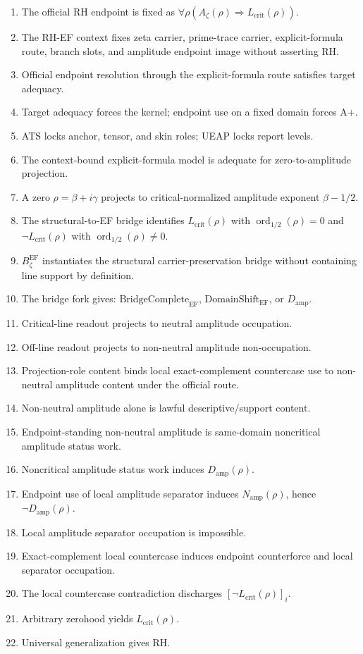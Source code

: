 \documentclass[11pt]{article}
\newcommand{\Az}{A_{\zeta}}
\newcommand{\Lcrit}{L_{\mathrm{crit}}}
\newcommand{\Damp}{D_{\mathrm{amp}}}
\newcommand{\Namp}{N_{\mathrm{amp}}}
\newcommand{\ordhalf}{\operatorname{ord}_{1/2}}
\newcommand{\BzetaEF}{B^{\mathrm{EF}}_{\zeta}}
\newcommand{\BridgeCompleteEF}{\mathrm{BridgeComplete}_{\mathrm{EF}}}
\newcommand{\DomainShiftEF}{\mathrm{DomainShift}_{\mathrm{EF}}}
\begin{document}
\begin{enumerate}
\item The official RH endpoint is fixed as \(\forall\rho(\Az(\rho)\Rightarrow\Lcrit(\rho))\).
\item The RH-EF context fixes zeta carrier, prime-trace carrier, explicit-formula route, branch slots, and amplitude endpoint image without asserting RH.
\item Official endpoint resolution through the explicit-formula route satisfies target adequacy.
\item Target adequacy forces the kernel; endpoint use on a fixed domain forces A+.
\item ATS locks anchor, tensor, and skin roles; UEAP locks report levels.
\item The context-bound explicit-formula model is adequate for zero-to-amplitude projection.
\item A zero \(\rho=\beta+i\gamma\) projects to critical-normalized amplitude exponent \(\beta-1/2\).
\item The structural-to-EF bridge identifies \(\Lcrit(\rho)\) with \(\ordhalf(\rho)=0\) and \(\neg\Lcrit(\rho)\) with \(\ordhalf(\rho)\ne0\).
\item \(\BzetaEF\) instantiates the structural carrier-preservation bridge without containing line support by definition.
\item The bridge fork gives: \(\BridgeCompleteEF\), \(\DomainShiftEF\), or \(\Damp\).
\item Critical-line readout projects to neutral amplitude occupation.
\item Off-line readout projects to non-neutral amplitude non-occupation.
\item Projection-role content binds local exact-complement countercase use to non-neutral amplitude content under the official route.
\item Non-neutral amplitude alone is lawful descriptive/support content.
\item Endpoint-standing non-neutral amplitude is same-domain noncritical amplitude status work.
\item Noncritical amplitude status work induces \(\Damp(\rho)\).
\item Endpoint use of local amplitude separator induces \(\Namp(\rho)\), hence \(\neg\Damp(\rho)\).
\item Local amplitude separator occupation is impossible.
\item Exact-complement local countercase induces endpoint counterforce and local separator occupation.
\item The local countercase contradiction discharges \([\neg\Lcrit(\rho)]_i\).
\item Arbitrary zerohood yields \(\Lcrit(\rho)\).
\item Universal generalization gives RH.
\end{enumerate}
\end{document}
